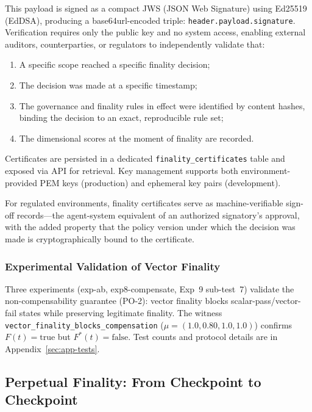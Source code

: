 \documentclass[11pt]{article}
\begin{document}
This payload is signed as a compact JWS (JSON Web Signature) using Ed25519 (EdDSA), producing a base64url-encoded triple: \texttt{header.payload.signature}. Verification requires only the public key and no system access, enabling external auditors, counterparties, or regulators to independently validate that:

\begin{enumerate}
  \item A specific scope reached a specific finality decision;
  \item The decision was made at a specific timestamp;
  \item The governance and finality rules in effect were identified by content hashes, binding the decision to an exact, reproducible rule set;
  \item The dimensional scores at the moment of finality are recorded.
\end{enumerate}

Certificates are persisted in a dedicated \texttt{finality\_certificates} table and exposed via API for retrieval. Key management supports both environment-provided PEM keys (production) and ephemeral key pairs (development).

For regulated environments, finality certificates serve as machine-verifiable sign-off records---the agent-system equivalent of an authorized signatory's approval, with the added property that the policy version under which the decision was made is cryptographically bound to the certificate.

\subsubsection{Experimental Validation of Vector Finality}
\label{sec:experimental-validation}

Three experiments (exp-ab, exp8-compensate, Exp~9 sub-test~7) validate the non-compensability guarantee (PO-2): vector finality blocks scalar-pass/vector-fail states while preserving legitimate finality. The witness \texttt{vector\_finality\_blocks\_compensation} ($\mu = (1.0, 0.80, 1.0, 1.0)$) confirms $F(t) = \text{true}$ but $F^*(t) = \text{false}$. Test counts and protocol details are in Appendix~\ref{sec:app-tests}.

\subsection{Perpetual Finality: From Checkpoint to Checkpoint}
\label{sec:perpetual-finality}
\end{document}
